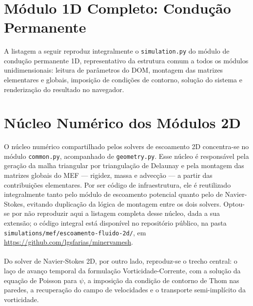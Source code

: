 \section{Módulo 1D Completo: Condução Permanente}
\label{ap:lst_conducao1d}

\paragraph{}A listagem a seguir reproduz integralmente o \texttt{simulation.py} do módulo de condução permanente 1D, representativo da estrutura comum a todos os módulos unidimensionais: leitura de parâmetros do DOM, montagem das matrizes elementares e globais, imposição de condições de contorno, solução do sistema e renderização do resultado no navegador.



\section{Núcleo Numérico dos Módulos 2D}
\label{ap:lst_nucleo2d}

\paragraph{}O núcleo numérico compartilhado pelos solvers de escoamento 2D concentra-se no módulo \texttt{common.py}, acompanhado de \texttt{geometry.py}. Esse núcleo é responsável pela geração da malha triangular por triangulação de Delaunay e pela montagem das matrizes globais do MEF --- rigidez, massa e advecção --- a partir das contribuições elementares. Por ser código de infraestrutura, ele é reutilizado integralmente tanto pelo módulo de escoamento potencial quanto pelo de Navier-Stokes, evitando duplicação da lógica de montagem entre os dois solvers. Optou-se por não reproduzir aqui a listagem completa desse núcleo, dada a sua extensão; o código integral está disponível no repositório público, na pasta \texttt{simulations/mef/escoamento-fluido-2d/}, em \url{https://github.com/lgsfarias/minervamesh}.

\paragraph{}Do solver de Navier-Stokes 2D, por outro lado, reproduz-se o trecho central: o laço de avanço temporal da formulação Vorticidade-Corrente, com a solução da equação de Poisson para $\psi$, a imposição da condição de contorno de Thom nas paredes, a recuperação do campo de velocidades e o transporte semi-implícito da vorticidade.


